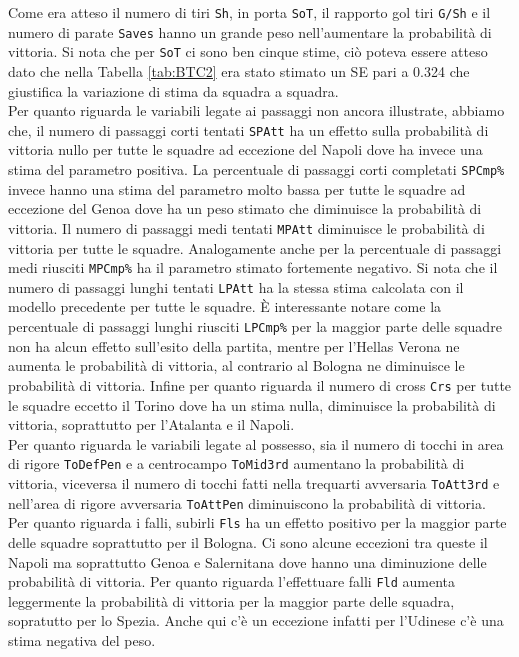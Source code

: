 Come era atteso il numero di tiri \texttt{Sh}, in porta \texttt{SoT}, il rapporto gol tiri \texttt{G/Sh} e il numero di parate \texttt{Saves} hanno un grande peso nell'aumentare la probabilità di vittoria. Si nota che per \texttt{SoT} ci sono ben cinque stime, ciò poteva essere atteso dato che nella Tabella \ref{tab:BTC2} era stato stimato un SE pari a 0.324 che giustifica la variazione di stima da squadra a squadra. \\
Per quanto riguarda le variabili legate ai passaggi non ancora illustrate, abbiamo che,
il numero di passaggi corti tentati \texttt{SPAtt} ha un effetto sulla probabilità di vittoria nullo per tutte le squadre ad eccezione del Napoli dove ha invece una stima del parametro positiva. La percentuale di passaggi corti completati \texttt{SPCmp\%} invece hanno una stima del parametro molto bassa per tutte le squadre ad eccezione del Genoa dove ha un peso stimato che diminuisce la probabilità di vittoria. Il numero di passaggi medi tentati \texttt{MPAtt} diminuisce le probabilità di vittoria per tutte le squadre. Analogamente anche per la percentuale di passaggi medi riusciti \texttt{MPCmp\%} ha il parametro stimato fortemente negativo. Si nota che il numero di passaggi lunghi tentati \texttt{LPAtt} ha la stessa stima calcolata con il modello precedente per tutte le squadre. È interessante notare come la percentuale di passaggi lunghi riusciti \texttt{LPCmp\%} per la maggior parte delle squadre non ha alcun effetto sull'esito della partita, mentre per l'Hellas Verona ne aumenta le probabilità di vittoria, al contrario al Bologna ne diminuisce le probabilità di vittoria. Infine per quanto riguarda il numero di cross \texttt{Crs} per tutte le squadre eccetto il Torino dove ha un stima nulla, diminuisce la probabilità di vittoria, soprattutto per l'Atalanta e il Napoli.\\
Per quanto riguarda le variabili legate al possesso, sia il numero di tocchi in area di rigore \texttt{ToDefPen} e a centrocampo \texttt{ToMid3rd} aumentano la probabilità di vittoria, viceversa il numero di tocchi fatti nella trequarti avversaria \texttt{ToAtt3rd} e nell'area di rigore avversaria \texttt{ToAttPen} diminuiscono la probabilità di vittoria.\\
Per quanto riguarda i falli, subirli \texttt{Fls} ha un effetto positivo per la maggior parte delle squadre soprattutto per il Bologna. Ci sono alcune eccezioni tra queste il Napoli ma soprattutto Genoa e Salernitana dove hanno una diminuzione delle probabilità di vittoria. Per quanto riguarda l'effettuare falli \texttt{Fld} aumenta leggermente la probabilità di vittoria per la maggior parte delle squadra, sopratutto per lo Spezia. Anche qui c'è un eccezione infatti per l'Udinese c'è una stima negativa del peso.\\
